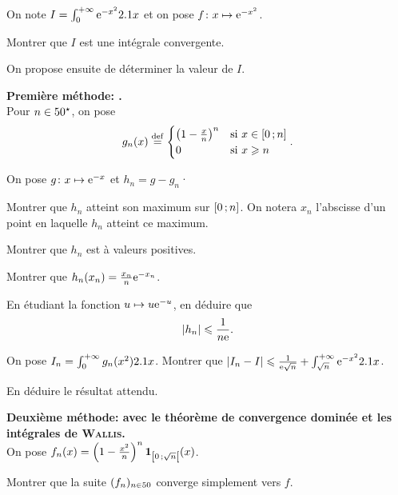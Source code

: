 \begin{exercice}
On note $I = \int_0^{+\infty} \e^{-x^2} \d x$ et on pose $\fonctionligne[f]{x}{\e^{-x^2}}$.

\begin{questions}
\item Montrer que $I$ est une intégrale convergente.
\end{questions}
On propose ensuite de déterminer la valeur de $I$.
\begin{questions}[resume]
\item \textbf{Première méthode: .} \\ 
Pour $n \in \Ne$, on pose
$$
g_n(x) \defeq
\begin{cases}
\left(1 - \frac{x}{n} \right)^n &\text{si } x \in \interff{0}{n} \\
0 &\text{si } x \geqslant n
\end{cases}.
$$

On pose $\fonctionligne[g]{x}{\e^{-x}}$ et $h_n = g - g_n$·
\begin{questions}
\item Montrer que $h_n$ atteint son maximum sur $\interff{0}{n}$. On notera $x_n$ l'abscisse d'un point en laquelle $h_n$ atteint ce maximum.

\item Montrer que $h_n$ est à valeurs positives.

\item Montrer que $h_n(x_n) = \frac{x_n}{n} \e^{-x_n}$.

\item En étudiant la fonction $u \mapsto u \e^{-u}$, en déduire que
\[
\module{h_n} \leqslant \frac{1}{n \e}.
\]

\item On pose $I_n= \int_0^{+\infty} g_n(x^2) \d x$. Montrer que $\module{I_n - I} \leqslant \frac{1}{\e \sqrt{n}} + \int_{\sqrt{n}}^{+\infty} \e^{-x^2} \d x$.

\item En déduire le résultat attendu.
\end{questions}

\item \textbf{Deuxième méthode: avec le théorème de convergence dominée et les intégrales de \textsc{Wallis.}} \\
On pose $f_n(x) = \left(1 - \frac{x^2}{n}\right)^n \indicatrice{\interfo{0}{\sqrt{n}}}(x)$.
\begin{questions}
\item Montrer que la suite $(f_n)_{n\in\N}$ converge simplement vers $f$.


\end{questions}
\end{questions}
\end{exercice}

